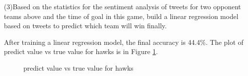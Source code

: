 \documentclass{article}
\begin{document}
(3)Based on the statistics for the sentiment analysis of tweets for two opponent teams above and the time of goal in this game, build a linear regression model based on tweets to predict which team will win finally.

After training a linear regression model, the final accuracy is 44.4\%. The plot of predict value vs true value for hawks is in Figure \ref{fig:q16res}.

\begin{figure}
\centering
{}
\caption{predict value vs true value for hawks} \label{fig:q16res}
\end{figure}
\end{document}
